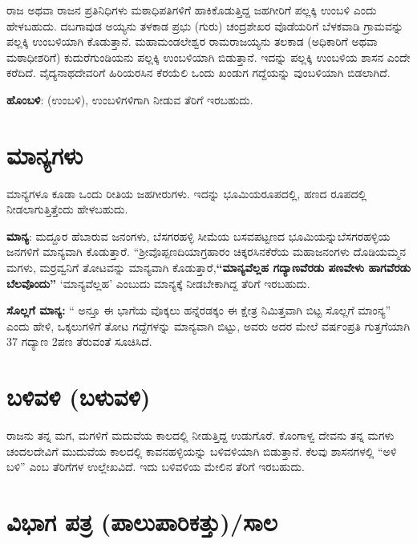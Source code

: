 ರಾಜ ಅಥವಾ ರಾಜನ ಪ್ರತಿನಿಧಿಗಳು ಮಠಾಧಿಪತಿಗಳಿಗೆ ಹಾಕಿಕೊಡುತ್ತಿದ್ದ ಜಹಗೀರಿಗೆ ಪಲ್ಲಕ್ಕಿ ಉಂಬಳಿ ಎಂದು ಹೇಳಬಹುದು. ದಬಗಾವುಡ ಅಯ್ಯನು ತಳಕಾಡ ಪ್ರಭು (ಗುರು) ಚಂದ್ರಶೇಖರ ವೊಡೆಯರಿಗೆ ಬೆಳಕವಾಡಿ ಗ್ರಾಮವನ್ನು ಪಲ್ಲಕ್ಕಿ ಉಂಬಳಿಯಾಗಿ ಕೊಡುತ್ತಾನೆ. ಮಹಾಮಂಡಲೇಶ್ವರ ರಾಮರಾಜಯ್ಯನು ತಲಕಾಡ (ಅಧಿಕಾರಿಗೆ ಅಥವಾ ಮಠಾಧೀಶರಿಗೆ) ಕುದುರೆಗುಂಡಿಯನು ಪಲ್ಲಕ್ಕಿ ಉಂಬಳಿಯಾಗಿ ಬಿಡುತ್ತಾನೆ. ಇದನ್ನು ಪಲ್ಲಕ್ಕಿ ಉಂಬಳಿಯ ಶಾಸನ ಎಂದೇ ಕರೆದಿದೆ. ವೈದ್ಯನಾಥದೇವರಿಗೆ ಹಿರಿಯರಸಿನ ಕೆರಯೆಲಿ ಒಂದು ಖಂಡುಗ ಗದ್ದೆಯನ್ನು ವುಂಬಳಿಯಾಗಿ ಬಿಡಲಾಗಿದೆ.

\textbf{ಹೊಂಬಳಿ}: (ಉಂಬಳಿ), ಉಂಬಳಿಗಳಿಗಾಗಿ ನೀಡುವ ತೆರಿಗೆ ಇರಬಹುದು.

\section{ಮಾನ್ಯಗಳು}

ಮಾನ್ಯಗಳೂ ಕೂಡಾ ಒಂದು ರೀತಿಯ ಜಹಗೀರುಗಳು. ಇದನ್ನು ಭೂಮಿಯರೂಪದಲ್ಲಿ, ಹಣದ ರೂಪದಲ್ಲಿ ನೀಡಲಾಗುತ್ತಿತ್ತೆಂದು ಹೇಳಬಹುದು.

\textbf{ಮಾನ್ಯ}: ಮದ್ದೂರ ಹೆಬಾರುವ ಜನಂಗಳು, ಬೆಸಗರಹಳ್ಳಿ ಸೀಮೆಯ ಬಸವಪಟ್ಟಣದ ಭೂಮಿಯನ್ನು\break ಬೆಸಗರಹಳ್ಳಿಯ ಜನಗಳಿಗೆ ಮಾನ್ಯವಾಗಿ ಕೊಡುತ್ತಾರೆ. “ಶ‍್ರೀವೊಪ್ಪಣದಿಯಾಗ್ರಹಾರಂ ಚಿಕ್ಕರಸಿನಕೆರೆಯ ಮಹಾಜನಂಗಳು ದೊಡಿಯಮ್ಮನ ಮಗಳು, ಮರ್ರವ್ವನಿಗೆ ತೋಟವನ್ನು ಮಾನ್ಯವಾಗಿ ಕೊಡುತ್ತಾರೆ,\textbf{“ಮಾನ್ಯವೆಲ್ಲಹ ಗದ್ಯಾಣವೆರಡು ಪಣವೇಳು ಹಾಗವೆರಡು ಬೆಲವೊಂದು”} `ಮಾನ್ಯವೆಲ್ಲಹ' ಎಂಬುದು ಮಾನ್ಯಕ್ಕೆ ನೀಡಬೇಕಾಗಿದ್ದ ತೆರಿಗೆ ಇರಬಹುದು.

\textbf{ಸೊಲ್ಲಗೆ ಮಾನ್ಯ:} “ ಅನ್ತೂ ಈ ಭಾಗೆಯ ವೊಕ್ಕಲು ಹನ್ನೆರಡಕ್ಕಂ ಈ ಕ್ಷೇತ್ರ ನಿಮಿತ್ತವಾಗಿ ಬಿಟ್ಟ ಸೊಲ್ಲಗೆ ಮಾಂನ್ಯ” ಎಂದು ಹೇಳಿ, ಒಕ್ಕಲುಗಳಿಗೆ ತೋಟ ಗದ್ದೆಗಳನ್ನು ಮಾನ್ಯವಾಗಿ ಬಿಟ್ಟು, ಅವರು ಅದರ ಮೇಲೆ ವರ್ಷಂಪ್ರತಿ ಗುತ್ತಗೆಯಾಗಿ 37 ಗದ್ಯಾಣ 2ಪಣ ತೆರುವಂತೆ ಸೂಚಿಸಿದೆ.

\section{ಬಳಿವಳಿ (ಬಳುವಳಿ)}

ರಾಜನು ತನ್ನ ಮಗ, ಮಗಳಿಗೆ ಮದುವೆಯ ಕಾಲದಲ್ಲಿ ನೀಡುತ್ತಿದ್ದ ಉಡುಗೊರೆ. ಕೊಂಗಾಳ್ವ ದೇವನು ತನ್ನ ಮಗಳು ಚಂದಲದೇವಿಗೆ ಮುದುವೆಯ ಕಾಲದಲ್ಲಿ ಕಾವನಹಳ್ಳಿಯನ್ನು ಬಳಿವಳಿಯಾಗಿ ಬಿಡುತ್ತಾನೆ. ಕೆಲವು ಶಾಸನಗಳಲ್ಲಿ “ಅಳಿ ಬಳಿ” ಎಂಬ ತೆರಿಗೆಗಳ ಉಲ್ಲೇಖವಿದೆ. ಇದು ಬಳಿವಳಿಯ ಮೇಲಿನ ತೆರಿಗೆ ಇರಬಹುದು.

\section{ವಿಭಾಗ ಪತ್ರ (ಪಾಲುಪಾರಿಕತ್ತು)/ಸಾಲ}

